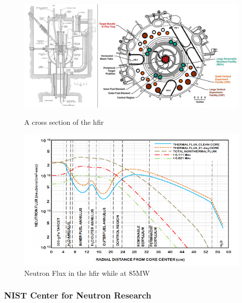 \begin{figure}[tbp]
  \begin{minipage}[b]{0.49\linewidth}
  \begin{center}
    \includegraphics[width=.98\linewidth]{chapters/background_activity/images/hfir-cross-sections.jpg}
    \caption{A cross section of the \acrshort{hfir} \cite{hfirornl}}
    \label{fig:hfirxs}
  \end{center}
  \end{minipage}
  \begin{minipage}[b]{0.49\linewidth}
  \begin{center}
    \includegraphics[width=.98\linewidth]{chapters/background_activity/images/hfirneutronflux.png}
    \caption{Neutron Flux in the \acrshort{hfir} while at 85MW \cite{hfiruserguide}}
    \label{fig:hfirflux}
  \end{center}
  \end{minipage}
\end{figure}



\FloatBarrier
\subsubsection{NIST Center for Neutron Research}

